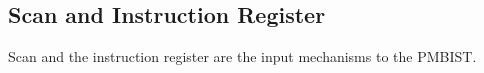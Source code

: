 \subsection{Scan and Instruction Register}
\label{sect:bg-blocks-scan-and-instruction-register}
Scan and the instruction register are the input mechanisms to the PMBIST.  
